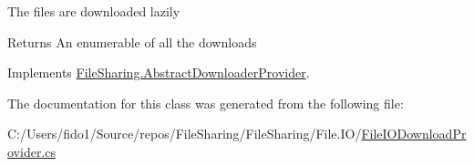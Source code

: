 The files are downloaded lazily 

\begin{DoxyReturn}{Returns}
An enumerable of all the downloads
\end{DoxyReturn}


Implements \hyperlink{class_file_sharing_1_1_abstract_downloader_provider_a38b11b25b2acda450d8406ca488585dd}{File\+Sharing.\+Abstract\+Downloader\+Provider}.



The documentation for this class was generated from the following file\+:\begin{DoxyCompactItemize}
\item 
C\+:/\+Users/fido1/\+Source/repos/\+File\+Sharing/\+File\+Sharing/\+File.\+I\+O/\hyperlink{_file_i_o_download_provider_8cs}{File\+I\+O\+Download\+Provider.\+cs}\end{DoxyCompactItemize}
